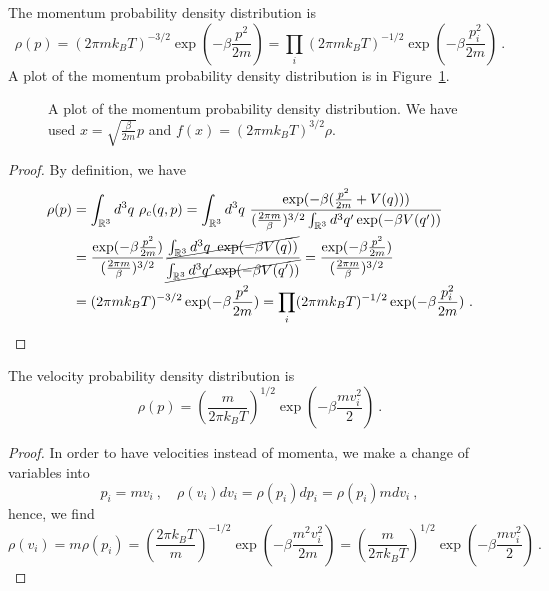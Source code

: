     The momentum probability density distribution is 
    \begin{equation*}
        \rho(p) = (2\pi m k_B T)^{-3/2} \exp(- \beta \frac{p^2}{2m}) = \prod_i (2\pi m k_B T)^{-1/2} \exp(- \beta \frac{p^2_i}{2m}) ~.
    \end{equation*}
    A plot of the momentum probability density distribution is in Figure~\ref{fig:mb:mom}.
    \begin{figure}
        \centering
        \caption{A plot of the momentum probability density distribution. We have used $x = \sqrt{\frac{\beta}{2m}} p$ and $f(x) = (2\pi m k_B T)^{3/2} \rho$.}
        \label{fig:mb:mom}
    \end{figure}
    \begin{proof}
        By definition, we have
        \begin{equation*}
        \begin{aligned}
            \rho(p) & = \int_{\mathbb R^3} d^3 q ~ \rho_c (q, p) = \int_{\mathbb R^3} d^3 q ~ \frac{\exp (- \beta ( \frac{p^2}{2m} + V(q) ))}{(\frac{2\pi m}{\beta})^{3/2} \int_{\mathbb R^3} d^3 q' \exp(- \beta V(q'))} \\ & = \frac{\exp(- \beta \frac{p^2}{2m})}{(\frac{2\pi m}{\beta})^{3/2}} \frac{\cancel{\int_{\mathbb R^3} d^3 q ~ \exp (- \beta V(q) )}}{\cancel{\int_{\mathbb R^3} d^3 q' \exp(- \beta V(q'))}} = \frac{\exp(- \beta \frac{p^2}{2m})}{(\frac{2\pi m}{\beta})^{3/2}} \\ & = (2\pi m k_B T)^{-3/2} \exp(- \beta \frac{p^2}{2m}) = \prod_i (2\pi m k_B T)^{-1/2} \exp(- \beta \frac{p^2_i}{2m}) ~.
        \end{aligned}
        \end{equation*}
    \end{proof}
    
    The velocity probability density distribution is
    \begin{equation*}
        \rho(p) = (\frac{m}{2\pi k_B T})^{1/2} \exp(- \beta \frac{m v^2_i}{2}) ~.
    \end{equation*}
    \begin{proof}
        In order to have velocities instead of momenta, we make a change of variables into
        \begin{equation*}
            p_i = m v_i ~, \quad \rho(v_i) dv_i = \rho(p_i) dp_i = \rho(p_i) m dv_i ~,
        \end{equation*}
        hence, we find
        \begin{equation*}
            \rho(v_i) = m \rho (p_i) = (\frac{2\pi k_B T}{m})^{-1/2} \exp(- \beta \frac{m^2 v^2_i}{2m}) = (\frac{m}{2\pi k_B T})^{1/2} \exp(- \beta \frac{m v^2_i}{2}) ~.
        \end{equation*}
    \end{proof}

